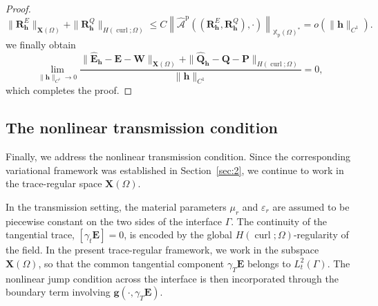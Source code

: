 \documentclass[12pt,reqno]{amsart}
\theoremstyle{definition}
\numberwithin{equation}{section}
\begin{document}
\begin{proof}
\[
\|\mathbf{R}_{\mathbf{h}}^E\|_{\mathbf{X}(\Omega)} + \|\mathbf{R}_{\mathbf{h}}^Q\|_{H(\operatorname{curl}; \Omega)} \le C \left\| \widehat{\mathcal{A}}^{\mathrm{p}}((\mathbf{R}_{\mathbf{h}}^E, \mathbf{R}_{\mathbf{h}}^Q), \cdot) \right\|_{\mathbb{X}_{\mathrm{p}}(\Omega)^*} = o(\|\mathbf{h}\|_{C^1}).
\]
we finally obtain
\[
\lim_{\|\mathbf{h}\|_{C^1} \to 0} \frac{\|\hat{\mathbf{E}}_{\mathbf{h}} - \mathbf{E} - \mathbf{W}\|_{\mathbf{X}(\Omega)} + \|\hat{\mathbf{Q}}_{\mathbf{h}} - \mathbf{Q} - \mathbf{P}\|_{H(\operatorname{curl};\Omega)}}{\|\mathbf{h}\|_{C^1}} = 0,
\]
which completes the proof.
\end{proof}



\subsection{The nonlinear transmission condition}

Finally, we address the nonlinear transmission condition. Since the corresponding variational framework was established in Section~\ref{sec:2}, we continue to work in the trace-regular space $\mathbf{X}(\Omega)$.

In the transmission setting, the material parameters \(\mu_r\) and
\(\varepsilon_r\) are assumed to be piecewise constant on the two sides of the
interface \(\Gamma\). The continuity of the tangential trace,
\([\gamma_t\mathbf E]=0\), is encoded by the global
\(H(\operatorname{curl};\Omega)\)-regularity of the field. In the present
trace-regular framework, we work in the subspace \(\mathbf X(\Omega)\), so that
the common tangential component \(\gamma_T\mathbf E\) belongs to
\(L_t^2(\Gamma)\). The nonlinear jump condition across the interface is then
incorporated through the boundary term involving
\(\mathbf g(\cdot,\gamma_T\mathbf E)\).
\end{document}
